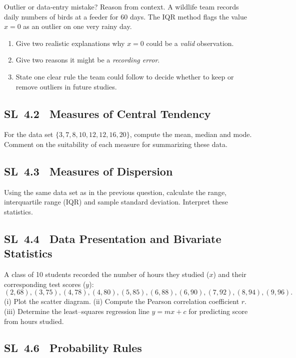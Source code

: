 \documentclass[11pt]{article}
\def\textbf#1{#1}%
\newcommand{\tocsubsection}[1]{\subsection{#1}}
\newcounter{question}
\begin{document}

\begin{question}
\textbf{Outlier or data-entry mistake? Reason from context.}
A wildlife team records daily numbers of birds at a feeder for 60 days. The IQR method flags the value $x=0$ as an outlier on one very rainy day.
\begin{enumerate}
  \item Give two realistic explanations why $x=0$ could be a \emph{valid} observation.
  \item Give two reasons it might be a \emph{recording error}.
  \item State one clear rule the team could follow to decide whether to keep or remove outliers in future studies.
\end{enumerate}
\end{question}






\tocsubsection{SL 4.2 \; Measures of Central Tendency}

\begin{question}
For the data set $\{3,7,8,10,12,12,16,20\}$, compute the mean, median and
mode.  Comment on the suitability of each measure for summarizing these data.
\end{question}

\tocsubsection{SL 4.3 \; Measures of Dispersion}

\begin{question}
Using the same data set as in the previous question, calculate the range,
interquartile range (IQR) and sample standard deviation.  Interpret these
statistics.
\end{question}

\tocsubsection{SL 4.4 \; Data Presentation and Bivariate Statistics}

\begin{question}
A class of 10 students recorded the number of hours they studied ($x$) and
their corresponding test scores ($y$):
\[(2,68),(3,75),(4,78),(4,80),(5,85),(6,88),(6,90),(7,92),(8,94),(9,96).
\]
(i) Plot the scatter diagram.  (ii) Compute the Pearson correlation coefficient
$r$.  (iii) Determine the least–squares regression line $y=mx+c$ for predicting
score from hours studied.
\end{question}

\tocsubsection{SL 4.6 \; Probability Rules}
\end{document}
